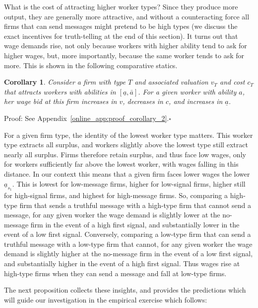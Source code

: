 \documentclass[12pt]{article}
\newtheorem{corollary}[theorem]{Corollary}
\begin{document}
What is the cost of attracting higher worker types? Since they produce more output, they are generally more attractive, and without a counteracting force all firms that can send messages might pretend to be high types (we discuss the exact incentives for truth-telling at the end of this section). It turns out that wage demands rise, not only because workers with higher ability tend to ask for higher wages, but, more importantly, because the same worker tends to ask for more. This is shown in the following comparative statics.

\begin{corollary}
\label{corollary 2}Consider a firm with type $T$ and associated valuation $v_{T}$ and cost $c_{T}$ that attracts workers with abilities in $[\underline{a},\bar{a}]$. For a given worker with ability $a$, her wage bid at this firm increases in $v$, decreases in $c$, and increases in $\underline{a}$.
\end{corollary}

\noindent Proof: See Appendix~\ref{online_app:proof_corollary_2}.$\square$\bigskip

For a given firm type, the identity of the lowest worker type matters. This worker type extracts all surplus, and workers slightly above the lowest type still extract nearly all surplus. Firms therefore retain surplus, and thus face low wages, only for workers sufficiently far above the lowest worker, with wages falling in this distance. In our context this means that a given firm faces lower wages the lower $\underline{a}_{s_{1}}$. This is lowest for low-message firms, higher for low-signal firms, higher still for high-signal firms, and highest for high-message firms. So, comparing a high-type firm that sends a truthful message with a high-type firm that cannot send a message, for any given worker the wage demand is slightly lower at the no-message firm in the event of a high first signal, and substantially lower in the event of a low first signal. Conversely, comparing a low-type firm that can send a truthful message with a low-type firm that cannot, for any given worker the wage demand is slightly higher at the no-message firm in the event of a low first signal, and substantially higher in the event of a high first signal. Thus wages rise at high-type firms when they can send a message and fall at low-type firms.

The next proposition collects these insights, and provides the predictions which will guide our investigation in the empirical exercise which follows:
\end{document}
